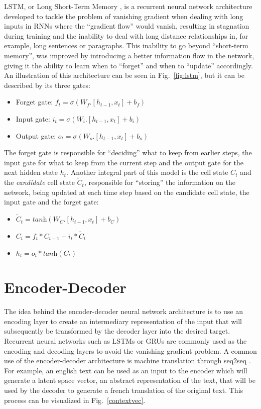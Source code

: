 LSTM, or Long Short-Term Memory \citep{lstm}, is a recurrent neural network architecture developed to tackle the problem of vanishing gradient when dealing with long inputs in RNNs where the ``gradient flow'' would vanish, resulting in stagnation during training and the inability to deal with long distance relationships in, for example, long sentences or paragraphs. This inability to go beyond ``short-term memory'', was improved by introducing a better information flow in the network, giving it the ability to learn when to ``forget'' and when to ``update'' accordingly.
An illustration of this architecture can be seen in Fig.~\ref{fig:lstm}, but it can be described by its three gates:

\begin{itemize}
    \item[] Forget gate:  $f_t = \sigma(W_f . [h_{t-1},x_t] + b_f)$
    \item[] Input gate: $i_t = \sigma(W_i . [h_{t-1},x_t] + b_i)$
    \item[] Output gate: $o_t = \sigma(W_o . [h_{t-1},x_t] + b_o)$ 
\end{itemize}

The forget gate is responsible for ``deciding'' what to keep from earlier steps, the input gate for what to keep from the current step and the output gate for the next hidden state $h_t$. Another integral part of this model is the cell state $C_t$ and the \textit{candidate} cell state $\tilde{C}_t$, responsible for ``storing'' the information on the network, being updated at each time step based on the candidate cell state, the input gate and the forget gate:


\begin{itemize}
    \item[] $\tilde{C}_t = \textit{tanh}(W_C . [h_{t-1}, x_t] + b_C)$
    \item[] $C_t = f_t * C_{t-1} + i_t * \tilde{C}_t$ 
    \item[] $h_t = o_t * \textit{tanh}(C_t)$
\end{itemize}


\section{Encoder-Decoder}
The idea behind the encoder-decoder neural network architecture is to use an encoding layer to create an intermediary representation of the input that will subsequently be transformed by the decoder layer into the desired target.
Recurrent neural networks such as LSTMs or GRUs \citep{GRU} are commonly used as the encoding and decoding layers to avoid the vanishing gradient problem. %
 A common use of the encoder-decoder architecture is machine translation through seq2seq \citep{seq2seq}. For example, an english text can be used as an input to the encoder which will generate a latent space vector, an abstract representation of the text, that will be used by the decoder to generate a french translation of the original text. This process can be visualized in Fig.~\ref{contextvec}.

